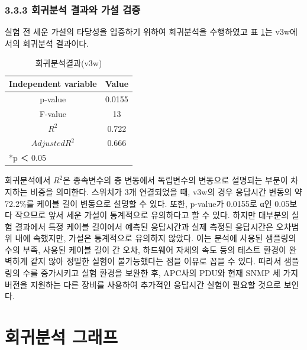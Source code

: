 \documentclass[11pt
  , a4paper
  , article
  , oneside
]{memoir}
\begin{document}
 \subsection{3.3.3 회귀분석 결과와 가설 검증}
 실험 전 세운 가설의 타당성을 입증하기 위하여 회귀분석을 수행하였고 표 \ref{table:regression}는 v3w에서의 회귀분석 결과이다.
 
\begin{table}[!htb]
\begin{center}
\begin{tabular}{c|c}\hline
Independent variable & Value  \\ \hline\hline
p-value &  0.0155\\ 
F-value &  13\\ 
$  R^2  $ &  0.722\\ 
$ Adjusted R^2 $ & 0.666 \\ \hline
\multicolumn{2}{l}{*p ＜ 0.05} \\ \hline\hline
\end{tabular}
\caption{회귀분석결과(v3w)}
  \label{table:regression}  
\end{center}
\end{table} 
회귀분석에서 $  R^2  $은 종속변수의 총 변동에서 독립변수의 변동으로 설명되는 부분이 차지하는 비중을 의미한다. 스위치가 3개 연결되었을 때, v3w의 경우 응답시간 변동의 약 72.2\%를 케이블 길이 변동으로 설명할 수 있다. 또한, p-value가 0.0155로 α인 0.05보다 작으므로 앞서 세운 가설이 통계적으로 유의하다고 할 수 있다. 하지만 대부분의 실험 결과에서 특정 케이블 길이에서 예측된 응답시간과 실제 측정된 응답시간은 오차범위 내에 속했지만, 가설은 통계적으로 유의하지 않았다. 이는 분석에 사용된 샘플링의 수의 부족, 사용된 케이블 길이 간 오차, 하드웨어 자체의 속도 등의 테스트 환경이 완벽하게 같지 않아 정밀한 실험이 불가능했다는 점을 이유로 꼽을 수 있다. 따라서 샘플링의 수를 증가시키고 실험 환경을 보완한 후, APC사의 PDU와 현재 SNMP 세 가지 버전을 지원하는 다른 장비를 사용하여 추가적인 응답시간 실험이 필요할 것으로 보인다. 

\clearpage
\appendix
\addappheadtotoc
\renewcommand*\printchaptername{\Large\bfseries\appendixname~}
\chapter{회귀분석 그래프}
\end{document}
